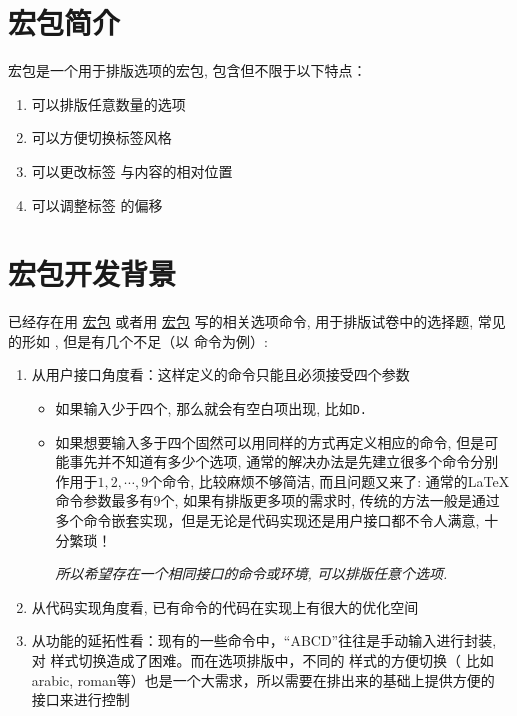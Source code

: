 \documentclass{xdyy-usermanual}
\begin{document}
\maketitle
\tableofcontents

\section{宏包简介}

宏包是一个用于排版选项的宏包, 包含但不限于以下特点：

\begin{enumerate}
  \item 可以排版任意数量的选项
  \item 可以方便切换标签风格 
  \item 可以更改标签  与内容的相对位置
  \item 可以调整标签  的偏移
\end{enumerate}


\section{宏包开发背景}


已经存在用 \href{https://www.latexstudio.net/index/details/index/mid/2270.html}{宏包} 或者用 \href{https://www.latexstudio.net/index/details/index/mid/2191.html}{宏包} 写的相关选项命令, 用于排版试卷中的选择题, 常见的形如 , 但是有几个不足（以  命令为例）:
\begin{enumerate}
  \item 从用户接口角度看：这样定义的命令只能且必须接受四个参数
    \begin{itemize}
      \item 如果输入少于四个, 那么就会有空白项出现, 比如\verb*|D.  |
      \item 如果想要输入多于四个固然可以用同样的方式再定义相应的命令, 但是可能事先并不知道有多少个选项, 通常的解决办法是先建立很多个命令分别作用于$1, 2, \cdots, 9$个命令, 比较麻烦不够简洁, 而且问题又来了: 通常的LaTeX命令参数最多有9个, 如果有排版更多项的需求时, 传统的方法一般是通过多个命令嵌套实现，但是无论是代码实现还是用户接口都不令人满意, 十分繁琐！
      
      \emph{所以希望存在一个相同接口的命令或环境, 可以排版任意个选项.}
    \end{itemize}
  \item 从代码实现角度看, 已有命令的代码在实现上有很大的优化空间
  \item 从功能的延拓性看：现有的一些命令中，“ABCD”往往是手动输入进行封装, 对  样式切换造成了困难。而在选项排版中，不同的   样式的方便切换（ 比如 arabic, roman等）也是一个大需求，所以需要在排出来的基础上提供方便的  接口来进行控制
\end{enumerate}
\end{document}
